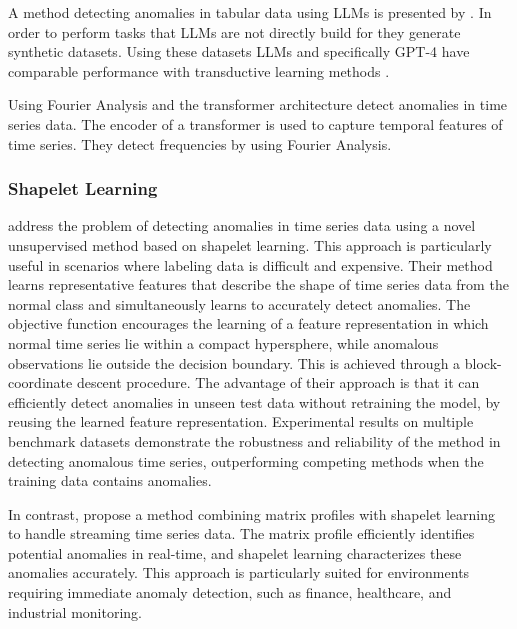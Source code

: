 A method detecting anomalies in tabular data using LLMs is presented by \cite{li_anomaly_2024}. In order to perform tasks that LLMs are not directly build for they generate synthetic datasets. Using these datasets LLMs and specifically GPT-4 have comparable performance with transductive learning methods \cite[p. 6]{li_anomaly_2024}.

Using Fourier Analysis and the transformer architecture \cite{ye_multivariate_2023} detect anomalies in time series data. The encoder of a transformer is used to capture temporal features of time series. They detect frequencies by using Fourier Analysis.

\subsubsection{Shapelet Learning}
\cite{beggel_time_2019} address the problem of detecting anomalies in time series data using a novel unsupervised method based on shapelet learning. This approach is particularly useful in scenarios where labeling data is difficult and expensive.
Their method learns representative features that describe the shape of time series data from the normal class and simultaneously learns to accurately detect anomalies. The objective function encourages the learning of a feature representation in which normal time series lie within a compact hypersphere, while anomalous observations lie outside the decision boundary. This is achieved through a block-coordinate descent procedure.
The advantage of their approach is that it can efficiently detect anomalies in unseen test data without retraining the model, by reusing the learned feature representation. Experimental results on multiple benchmark datasets demonstrate the robustness and reliability of the method in detecting anomalous time series, outperforming competing methods when the training data contains anomalies.

In contrast, \cite{alshaer_detecting_2020} propose a method combining matrix profiles with shapelet learning to handle streaming time series data. The matrix profile efficiently identifies potential anomalies in real-time, and shapelet learning characterizes these anomalies accurately. This approach is particularly suited for environments requiring immediate anomaly detection, such as finance, healthcare, and industrial monitoring.

